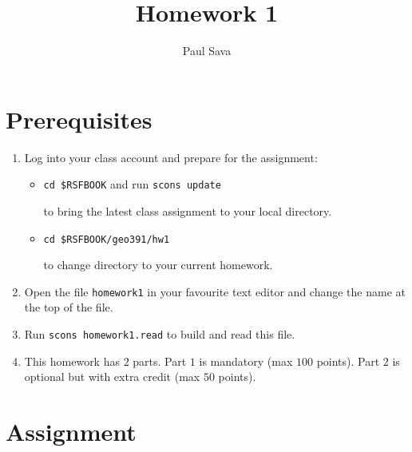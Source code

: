 \author{Paul Sava}
\title{Homework 1}




\section{Prerequisites}

\begin{enumerate}
\item Log into your class account and prepare for the assignment:

\begin{itemize}
\item \texttt{cd \$RSFBOOK} and run \texttt{scons update} \par
to bring the latest class assignment to your local directory.
\item \texttt{cd \$RSFBOOK/geo391/hw1} \par
to change directory to your current homework.
\end{itemize}

\item Open the file \texttt{homework1} in your favourite text editor
and change the name at the top of the file.

\item Run \texttt{scons homework1.read} to build and 
read this file.

\item This homework has $2$ parts. 
Part $1$ is mandatory (max $100$ points).
Part $2$ is optional but with extra credit (max $50$ points).

\end{enumerate}


\section{Assignment}

